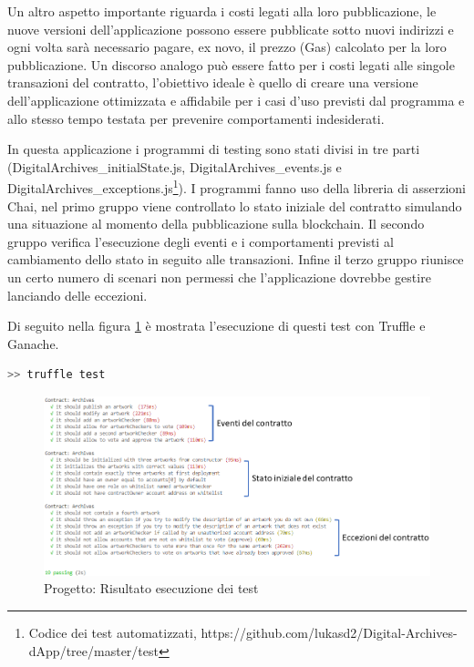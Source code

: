 Un altro aspetto importante riguarda i costi legati alla loro pubblicazione, le nuove versioni dell'applicazione possono essere pubblicate sotto nuovi indirizzi e ogni volta sarà necessario pagare, ex novo, il prezzo (Gas) calcolato per la loro pubblicazione. Un discorso analogo può essere fatto per i costi legati alle singole transazioni del contratto, l'obiettivo ideale è quello di creare una versione dell'applicazione ottimizzata e affidabile per i casi d'uso previsti dal programma e allo stesso tempo testata per prevenire comportamenti indesiderati.

In questa applicazione i programmi di testing sono stati divisi in tre parti (DigitalArchives\_initialState.js, DigitalArchives\_events.js e DigitalArchives\_exceptions.js{\footnote{Codice dei test automatizzati, https://github.com/lukasd2/Digital-Archives-dApp/tree/master/test}}). I programmi fanno uso della libreria di asserzioni Chai, nel primo gruppo viene controllato lo stato iniziale del contratto simulando una situazione al momento della pubblicazione sulla blockchain. Il secondo gruppo verifica l'esecuzione degli eventi e i comportamenti previsti al cambiamento dello stato in seguito alle transazioni. Infine il terzo gruppo riunisce un certo numero di scenari non permessi che l'applicazione dovrebbe gestire lanciando delle eccezioni.

Di seguito nella figura \ref{fig:contractTests} è mostrata l'esecuzione di questi test con Truffle e Ganache.
\\
\begin{lstlisting}[caption={Truffle esecuzione di test},language=JavaScript]
>> truffle test
\end{lstlisting}

\begin{figure}[H]
\centering
\includegraphics[width=1\textwidth]{immagini/testContratti.png}
\caption{Progetto: Risultato esecuzione dei test}
\label{fig:contractTests}
\end{figure}


